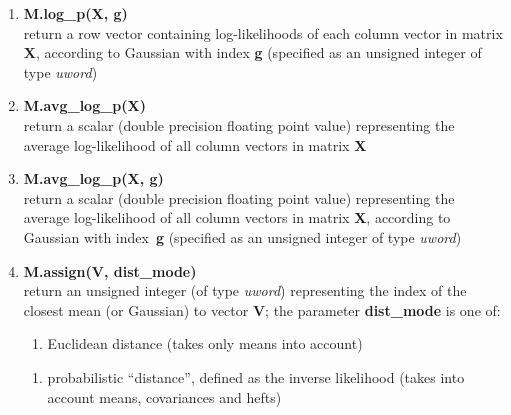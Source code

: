 \begin{enumerate}[{$\bullet$}]
\item
{\bf M.log\_p(X, g)}\\
return a row vector containing log-likelihoods of each column vector in matrix {\bf X},
according to Gaussian with index {\bf g}  (specified as an unsigned integer of type {\it uword})

\item
{\bf M.avg\_log\_p(X)}\\
return a scalar (double precision floating point value) representing the average log-likelihood of all column vectors in matrix {\bf X}

\item
{\bf M.avg\_log\_p(X, g)}\\
return a scalar (double precision floating point value) representing the average log-likelihood of all column vectors in matrix {\bf X},
according to Gaussian with index~{\bf g}  (specified as an unsigned integer of type {\it uword})

\item
{\bf M.assign(V, dist\_mode)}\\
return an unsigned integer (of type {\it uword}) representing the index of the
closest mean (or Gaussian) to vector {\bf V}; the parameter {\bf dist\_mode} is one
of:
\begin{small}
\begin{enumerate}
\item
Euclidean distance (takes only means into account)
\end{enumerate}

\begin{enumerate}
\item
probabilistic ``distance'', defined as the inverse likelihood (takes into account means, covariances and hefts)
\end{enumerate}
\end{small}



\end{enumerate}
